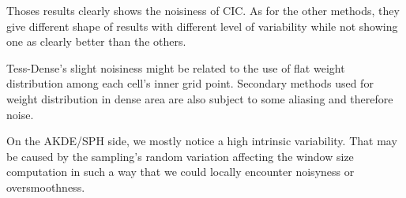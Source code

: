 \documentclass[10pt,a4paper,twoside,twocolumn]{article}
\newcommand*{\rootPath}{../}
\begin{document}
Thoses results clearly shows the noisiness of CIC. As for the other methods,
they give different shape of results with different level of variability while
not showing one as clearly better than the others.

Tess-Dense's slight noisiness might be related to the use of flat weight
distribution among each cell's inner grid point. Secondary methods used for
weight distribution in dense area are also subject to some aliasing and
therefore noise.

On the AKDE/SPH side, we mostly notice a high intrinsic variability. That may be
caused by the sampling's random variation affecting the window size computation
in such a way that we could locally encounter noisyness or oversmoothness.

\ifstandalone
	
	
\fi
\end{document}
